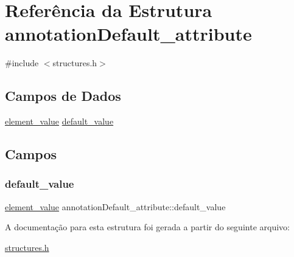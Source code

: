 \hypertarget{structannotationDefault__attribute}{}\section{Referência da Estrutura annotation\+Default\+\_\+attribute}
\label{structannotationDefault__attribute}


{\ttfamily \#include $<$structures.\+h$>$}

\subsection*{Campos de Dados}
\begin{DoxyCompactItemize}
\item 
\hyperlink{structelement__value}{element\+\_\+value} \hyperlink{structannotationDefault__attribute_a18525b7817b25760609cda9ebaadfbb3}{default\+\_\+value}
\end{DoxyCompactItemize}


\subsection{Campos}
\mbox{\label{structannotationDefault__attribute_a18525b7817b25760609cda9ebaadfbb3}} 
\subsubsection{\texorpdfstring{default\+\_\+value}{default\_value}}
{\footnotesize\ttfamily \hyperlink{structelement__value}{element\+\_\+value} annotation\+Default\+\_\+attribute\+::default\+\_\+value}



A documentação para esta estrutura foi gerada a partir do seguinte arquivo\+:\begin{DoxyCompactItemize}
\item 
\hyperlink{structures_8h}{structures.\+h}\end{DoxyCompactItemize}
